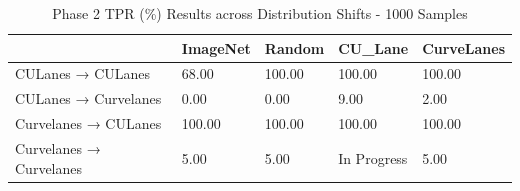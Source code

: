 \begin{table}
\caption{Phase 2 TPR (\%) Results across Distribution Shifts - 1000 Samples}
\label{tab:phase2_tpr_1000}
\begin{tabular}{lllll}
\toprule
 & ImageNet & Random & CU_Lane & CurveLanes \\
\midrule
CULanes → CULanes & 68.00 & 100.00 & 100.00 & 100.00 \\
CULanes → Curvelanes & 0.00 & 0.00 & 9.00 & 2.00 \\
Curvelanes → CULanes & 100.00 & 100.00 & 100.00 & 100.00 \\
Curvelanes → Curvelanes & 5.00 & 5.00 & In Progress & 5.00 \\
\bottomrule
\end{tabular}
\end{table}

